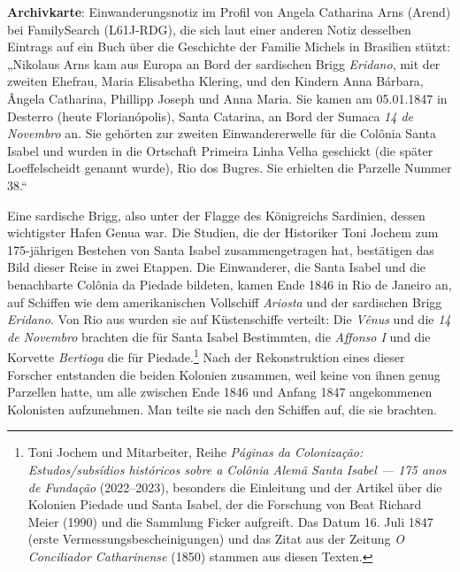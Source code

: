 \documentclass[
  ngerman,
  11pt,
  openany]{book}
\begin{document}
\begin{ficha}

\textbf{Archivkarte}: Einwanderungsnotiz im Profil von Angela Catharina
Arns (Arend) bei FamilySearch (L61J-RDG), die sich laut einer anderen
Notiz desselben Eintrags auf ein Buch über die Geschichte der Familie
Michels in Brasilien stützt: „Nikolaus Arns kam aus Europa an Bord der
sardischen Brigg \emph{Eridano}, mit der zweiten Ehefrau, Maria
Elisabetha Klering, und den Kindern Anna Bárbara, Ângela Catharina,
Phillipp Joseph und Anna Maria. Sie kamen am 05.01.1847 in Desterro
(heute Florianópolis), Santa Catarina, an Bord der Sumaca \emph{14 de
Novembro} an. Sie gehörten zur zweiten Einwandererwelle für die Colônia
Santa Isabel und wurden in die Ortschaft Primeira Linha Velha geschickt
(die später Loeffelscheidt genannt wurde), Rio dos Bugres. Sie erhielten
die Parzelle Nummer 38.``

\end{ficha}

Eine sardische Brigg, also unter der Flagge des Königreichs Sardinien,
dessen wichtigster Hafen Genua war. Die Studien, die der Historiker Toni
Jochem zum 175-jährigen Bestehen von Santa Isabel zusammengetragen hat,
bestätigen das Bild dieser Reise in zwei Etappen. Die Einwanderer, die
Santa Isabel und die benachbarte Colônia da Piedade bildeten, kamen Ende
1846 in Rio de Janeiro an, auf Schiffen wie dem amerikanischen
Vollschiff \emph{Ariosta} und der sardischen Brigg \emph{Eridano}. Von
Rio aus wurden sie auf Küstenschiffe verteilt: Die \emph{Vênus} und die
\emph{14 de Novembro} brachten die für Santa Isabel Bestimmten, die
\emph{Affonso I} und die Korvette \emph{Bertioga} die für
Piedade.\footnote{Toni Jochem und Mitarbeiter, Reihe \emph{Páginas da
  Colonização: Estudos/subsídios históricos sobre a Colônia Alemã Santa
  Isabel --- 175 anos de Fundação} (2022--2023), besonders die
  Einleitung und der Artikel über die Kolonien Piedade und Santa Isabel,
  der die Forschung von Beat Richard Meier (1990) und die Sammlung
  Ficker aufgreift. Das Datum 16. Juli 1847 (erste
  Vermessungsbescheinigungen) und das Zitat aus der Zeitung \emph{O
  Conciliador Catharinense} (1850) stammen aus diesen Texten.} Nach der
Rekonstruktion eines dieser Forscher entstanden die beiden Kolonien
zusammen, weil keine von ihnen genug Parzellen hatte, um alle zwischen
Ende 1846 und Anfang 1847 angekommenen Kolonisten aufzunehmen. Man
teilte sie nach den Schiffen auf, die sie brachten.
\end{document}
